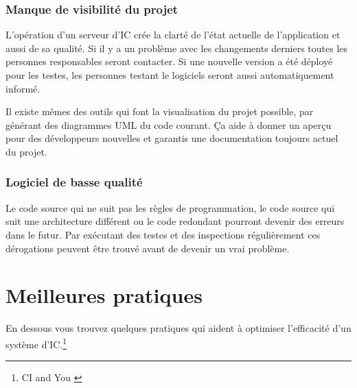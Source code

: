 \subsubsection{Manque de visibilité du projet}
L'opération d'un serveur d'IC crée la clarté de l'état actuelle de l'application et aussi de sa qualité. Si il y a un problème avec les changements derniers toutes les personnes responsables seront contacter. Si une nouvelle version a été déployé pour les testes, les personnes testant le logiciels seront aussi automatiquement informé.

Il existe mêmes des outils qui font la visualisation du projet possible, par générant des diagrammes UML du code courant. Ça aide à donner un aperçu pour des développeurs nouvelles et garantis une documentation toujours actuel du projet.
\subsubsection{Logiciel de basse qualité }
Le code source qui ne suit pas les règles de programmation, le code source qui suit une architecture différent ou le code redondant pourront devenir des erreurs dans le futur.
Par exécutant des testes et des inspections régulièrement ces dérogations peuvent être trouvé avant de devenir un vrai problème.
\clearpage

\section{Meilleures pratiques}
\label{sec:meuilleurespratiques}

En dessous vous trouvez quelques pratiques qui aident à optimiser l'efficacité d'un système d'IC.\footnote{CI and You \cite[p~47]{duvallconint}}

